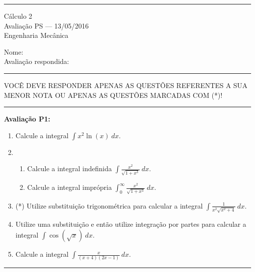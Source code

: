 \documentclass{article}
\newcommand{\ds}{\displaystyle}
\begin{document}
\noindent{}\rule{\textwidth}{0.4pt}
\begin{center}
	C\'alculo 2\\
	Avalia\c{c}\~ao PS --- 13/05/2016 \\
	Engenharia Mec\^anica \\
	\vspace{0.2cm}
\end{center}
Nome: \\
Avalia\c{c}\~ao respondida: \\
\noindent{}\rule{\textwidth}{0.4pt}


\begin{center}
VOC\^E DEVE RESPONDER APENAS AS QUEST\~OES REFERENTES A SUA MENOR NOTA OU APENAS AS QUEST\~OES MARCADAS COM (*)!\@
\end{center}

\noindent{}\rule{\textwidth}{0.4pt}
{\bf Avalia\c{c}\~ao P1:}
\begin{enumerate}
\item Calcule a integral $\displaystyle\int x^2 \ln(x)\ dx$.

\item
	\begin{enumerate}
		\item Calcule a integral indefinida $\displaystyle\int \frac{x^2}{\sqrt{1+x^3}}\ dx$.
		\item Calcule a integral impr\'opria $\displaystyle\int_0^\infty \frac{x^2}{\sqrt{1+x^3}}\ dx$.
	\end{enumerate}

\item (*) Utilize substitui\c{c}\~ao trigonom\'etrica para calcular a integral $\displaystyle\int \frac{1}{x^2 \sqrt{x^2+4}}\ dx$.

\item Utilize uma substitui\c{c}\~ao e ent\~ao utilize integra\c{c}\~ao por partes para calcular a integral $\displaystyle\int\cos(\sqrt{x})\ dx$.

\item Calcule a integral $\ds\int \frac{x}{(x+4)(2x-1)}\ dx$.

\end{enumerate}
\noindent{}\rule{\textwidth}{0.4pt}
\end{document}
